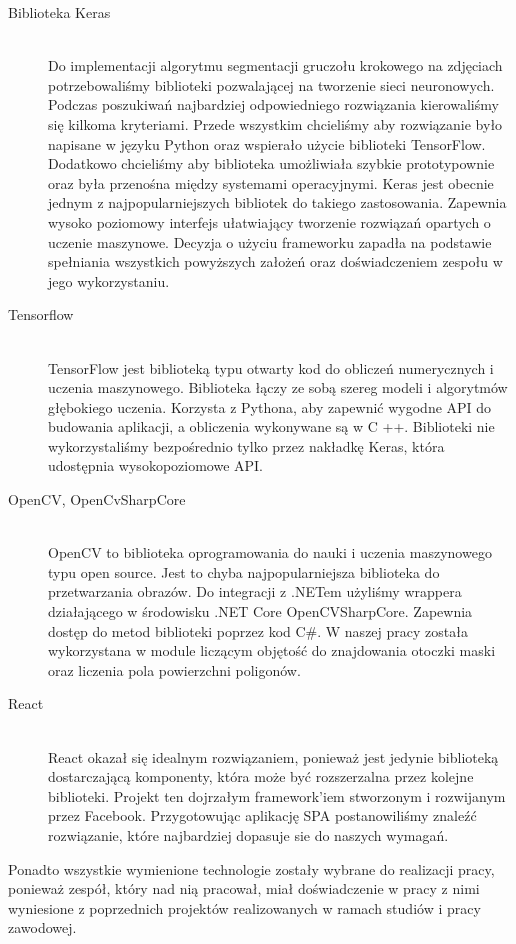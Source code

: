 \documentclass[a4paper,11pt,twoside]{report}
\theoremstyle{definition}
\begin{document}
\begin{description}
\item [Biblioteka Keras] \hfill \\
Do implementacji algorytmu segmentacji gruczołu krokowego na zdjęciach potrzebowaliśmy biblioteki pozwalającej na tworzenie sieci neuronowych. Podczas poszukiwań najbardziej odpowiedniego rozwiązania kierowaliśmy się kilkoma kryteriami. Przede wszystkim chcieliśmy aby rozwiązanie było napisane w języku Python oraz wspierało użycie biblioteki TensorFlow. Dodatkowo chcieliśmy aby biblioteka umożliwiała szybkie prototypownie oraz była przenośna między systemami operacyjnymi. Keras jest obecnie jednym z najpopularniejszych bibliotek do takiego zastosowania. Zapewnia wysoko poziomowy interfejs ułatwiający tworzenie rozwiązań opartych o uczenie maszynowe. Decyzja o użyciu frameworku zapadła na podstawie spełniania wszystkich powyższych założeń oraz doświadczeniem zespołu w jego wykorzystaniu.
\item[Tensorflow] \hfill \\
TensorFlow jest biblioteką typu otwarty kod do obliczeń numerycznych i uczenia maszynowego. Biblioteka łączy ze sobą szereg modeli i algorytmów głębokiego uczenia. Korzysta z Pythona, aby zapewnić wygodne API do budowania aplikacji, a obliczenia wykonywane są w C ++. Biblioteki nie wykorzystaliśmy bezpośrednio tylko przez nakładkę Keras, która udostępnia wysokopoziomowe API.
\item [OpenCV, OpenCvSharpCore] \hfill \\
OpenCV \cite{OpenCV} to biblioteka oprogramowania do nauki i uczenia maszynowego typu open source. Jest to chyba najpopularniejsza biblioteka do przetwarzania obrazów. Do integracji z .NETem użyliśmy wrappera działającego w środowisku .NET Core OpenCVSharpCore. Zapewnia dostęp do metod biblioteki poprzez kod C\#. W naszej pracy została wykorzystana w module liczącym objętość do znajdowania otoczki maski oraz liczenia pola powierzchni poligonów.
\item [React] \hfill \\
  React okazał się idealnym rozwiązaniem, ponieważ jest jedynie biblioteką dostarczającą komponenty, która może być rozszerzalna przez kolejne biblioteki. Projekt ten dojrzałym framework'iem stworzonym i rozwijanym przez Facebook. Przygotowując aplikację SPA postanowiliśmy znaleźć rozwiązanie, które najbardziej dopasuje sie do naszych wymagań. 
\end{description}

Ponadto wszystkie wymienione technologie zostały wybrane do realizacji pracy, ponieważ zespół, który nad nią pracował, miał doświadczenie w pracy z nimi wyniesione z poprzednich projektów realizowanych w ramach studiów i pracy zawodowej.
\end{document}
